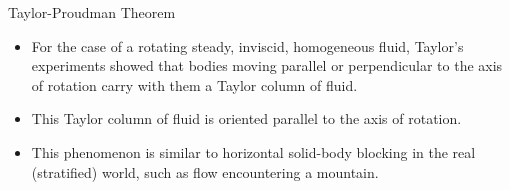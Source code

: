 \begin{frame}{Taylor-Proudman Theorem}
\begin{itemize}
	\item For the case of a rotating steady, inviscid, homogeneous fluid, Taylor's experiments showed that bodies moving parallel or perpendicular to the axis of rotation carry with them a Taylor column of fluid.
	\item This Taylor column of fluid is oriented parallel to the axis of rotation.
	\item This phenomenon is similar to horizontal solid-body blocking in the real (stratified) world, such as flow encountering a mountain.
\end{itemize}
\end{frame}
